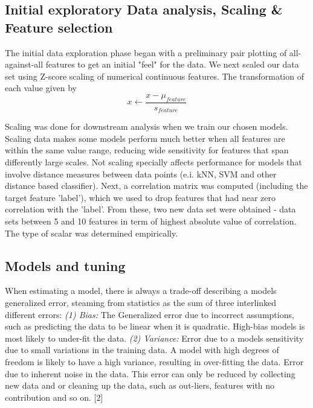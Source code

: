 \documentclass{article}
\begin{document}
    \subsection{Initial exploratory Data analysis, Scaling & Feature selection}
    
    The initial data exploration phase began with a preliminary pair plotting of all-against-all features to get an initial "feel" for the data. We next scaled our data set using Z-score scaling of numerical continuous features. The transformation of each value given by  
   \[ x \leftarrow \frac{x-\mu_{feature} }{s_{feature}}\]
   
   Scaling was done for downstream analysis when we train our chosen models. Scaling data  makes some models perform much better when all features are within the same value range, reducing wide sensitivity for features that span differently large scales. Not scaling specially affects performance for models that involve distance measures between data points (e.i. kNN, SVM and other distance based classifier). Next, a correlation matrix was computed (including the target feature 'label'), which we used to drop features that had near zero correlation with the 'label'. From these, two new data set were obtained - data sets between 5 and 10 features in term of highest absolute value of correlation. The type of scalar was determined empirically. 
   
   
   
   
    \subsection{Models and tuning}
    
    When estimating a model, there is always a trade-off describing a models generalized error, steaming from statistics as the sum of three interlinked different errors: 
    \textit{(1) Bias: } The Generalized error due to incorrect assumptions, such as predicting the data to be linear when it is quadratic. High-bias models is most likely to under-fit the data.
    \textit{(2) Variance: }Error due to a models sensitivity due to small variations in the training data. A model with high degrees of freedom is likely to have a high variance, resulting in over-fitting the data.
     Error due to inherent noise in the data. This error can only be reduced by collecting new data and or cleaning up the data, such as out-liers, features with no contribution and so on. [2]
        
\end{document}
